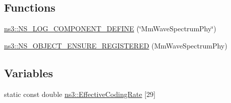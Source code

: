 \subsection*{Functions}
\begin{DoxyCompactItemize}
\item 
\hyperlink{namespacens3_ae23029aec37c2b16c2dbfddb3fe835a0}{ns3\+::\+N\+S\+\_\+\+L\+O\+G\+\_\+\+C\+O\+M\+P\+O\+N\+E\+N\+T\+\_\+\+D\+E\+F\+I\+NE} (\char`\"{}Mm\+Wave\+Spectrum\+Phy\char`\"{})
\item 
\hyperlink{namespacens3_a4de4423ad13c4a404abff905eba5fab1}{ns3\+::\+N\+S\+\_\+\+O\+B\+J\+E\+C\+T\+\_\+\+E\+N\+S\+U\+R\+E\+\_\+\+R\+E\+G\+I\+S\+T\+E\+R\+ED} (Mm\+Wave\+Spectrum\+Phy)
\end{DoxyCompactItemize}
\subsection*{Variables}
\begin{DoxyCompactItemize}
\item 
static const double \hyperlink{namespacens3_af70af4887722b3badf3d57ca573d9502}{ns3\+::\+Effective\+Coding\+Rate} \mbox{[}29\mbox{]}
\end{DoxyCompactItemize}
